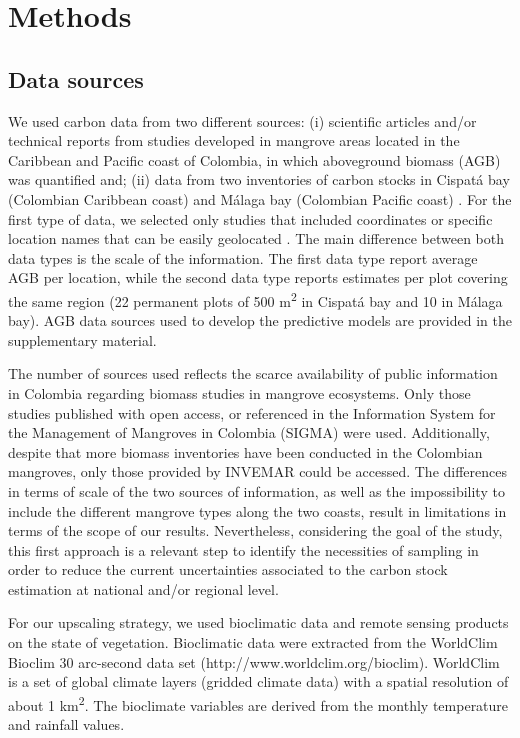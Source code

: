 \documentclass[review, authoryear]{elsarticle}   	%
\begin{document}
\section{Methods}
\subsection{Data sources}
We used carbon data from two different sources: (i) scientific articles and/or technical reports from studies developed in mangrove areas located in the Caribbean and Pacific coast of Colombia, in which aboveground biomass (AGB) was quantified and; (ii) data from two inventories of carbon stocks in Cispat\'{a} bay (Colombian Caribbean coast) and M\'{a}laga bay (Colombian Pacific coast) \citep{Yepes2016, Malaga2015}. For the first type of data, we selected only studies that included coordinates or specific location names that can be easily geolocated \citep{INVEMAR2007, Lema2007, DelaPena2010, Blanco2012}. The main difference between both data types is the scale of the information. The first data type report average AGB per location, while the second data type reports estimates per plot covering the same region  (22 permanent plots of 500 m\textsuperscript2 in Cispat\'{a} bay  and 10 in M\'{a}laga bay). AGB data sources used to develop the predictive models are provided in the supplementary material.  

The number of sources used reflects the scarce availability of public information in Colombia regarding biomass studies in mangrove ecosystems. Only those studies published with open access, or referenced in the Information System for the Management of Mangroves in Colombia (SIGMA) were used. Additionally, despite that more biomass inventories have been conducted in the Colombian mangroves, only those provided by INVEMAR could be accessed. The differences in terms of scale of the two sources of information, as well as the impossibility to include the different mangrove types along the two coasts, result in limitations in terms of the scope of our results. Nevertheless, considering the goal of the study, this first approach is a relevant step to identify the necessities of sampling in order to reduce the current uncertainties associated to the carbon stock estimation at national and/or regional level.

For our upscaling strategy, we used bioclimatic data and remote sensing products on the state of vegetation. 
Bioclimatic data were extracted from the WorldClim Bioclim \citep{Hijmans2005} 30 arc-second data set (http://www.worldclim.org/bioclim). WorldClim is a set of global climate layers (gridded climate data) with a spatial resolution of about 1 km\textsuperscript2. The bioclimate variables are derived from the monthly temperature and rainfall values.
\end{document}
